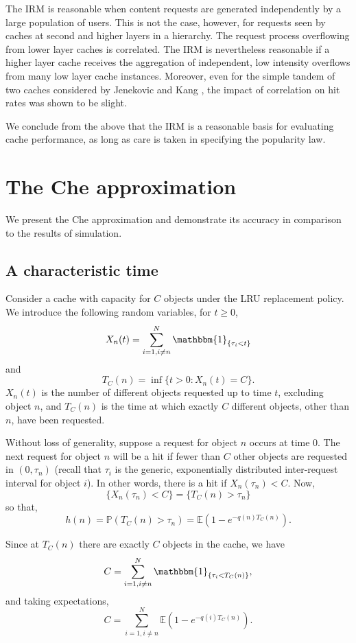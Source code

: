 \documentclass{amsart}
\def\P{{\mathbb P}}
\def\E{{\mathbb E}}
\newcommand\ind[1]{\mathbbm{1}_{\left\{#1\right\}}}
\begin{document}
The IRM is reasonable when content requests are generated independently by a large population of users. This is not the case, however, for requests seen by caches at second and higher layers in a hierarchy. The request process overflowing from lower layer caches is correlated. The IRM is nevertheless reasonable if a higher layer cache receives the aggregation of independent, low intensity overflows from many low layer cache instances. Moreover, even for the simple tandem of two caches considered by Jenekovic and Kang \cite{JK08}, the impact of correlation on hit rates was shown to be slight.

We conclude from the above that the IRM is a reasonable basis for evaluating cache performance, as long as care is taken in specifying the popularity law. 



\section{The Che approximation}
\label{sec:cheapprox}
We present the Che approximation and demonstrate its accuracy in comparison to the results of simulation.

\subsection{A characteristic time}
\label{criticaltime}
Consider a cache with capacity for $C$ objects under the LRU replacement policy. We introduce the following random variables, for $t\geq 0$, 
\[
X_n(t)=\sum_{i=1, i\ne n}^{N}\ind{\tau_i<t}
\]
and
 $$T_C(n)=\inf\{t>0: X_n(t)=C\}.$$
$X_n(t)$ is the number of different objects requested up to time $t$, excluding object $n$, and $T_C(n)$ is the time at which exactly $C$ different objects, other than $n$, have been requested. 

Without loss of generality, suppose a request for object $n$ occurs at time 0. The next request for object $n$ will be a hit if fewer than $C$ other objects are requested in $(0,\tau_n)$ (recall that $\tau_i$ is the generic, exponentially distributed inter-request interval  for object $i$). In other words, there is a hit if $X_n(\tau_n)<C$. Now,  $$\{X_n(\tau_n)<C\} =\{T_C(n)>\tau_n\}$$ so that, 
$$h(n)=\P(T_C(n)>\tau_n)=\E\left(1{-}e^{-q(n)T_C(n)}\right).$$

Since at $T_C(n)$ there are exactly $C$ objects in the cache, we have 
$$C=\sum_{i=1,i\ne n}^{N}\ind{\tau_i<T_C(n)},$$
and taking expectations,
\begin{equation*}
C=\sum_{i=1,i\ne n}^{N}\E\left(1-e^{-q(i)T_C(n)}\right).
\end{equation*}
\end{document}
